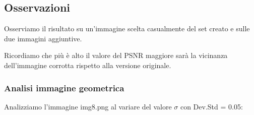 \subsection{Osservazioni}
Osserviamo il risultato su un'immagine scelta casualmente del set creato e sulle due immagini aggiuntive.

Ricordiamo che più è alto il valore del PSNR maggiore sarà la vicinanza dell'immagine corrotta rispetto alla versione originale. 

\subsubsection{Analisi immagine geometrica}
Analizziamo l'immagine img8.png al variare del valore $\sigma$ con Dev.Std = 0.05:

